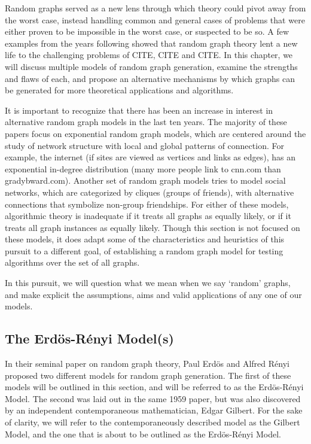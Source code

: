 \documentclass[11pt,a4paper]{report}
\begin{document}
Random graphs served as a new lens through which theory could pivot away from the worst case, instead handling common and general cases of problems that were either proven to be impossible in the worst case, or suspected to be so. 
A few examples from the years following showed that random graph theory lent a new life to the challenging problems of CITE, CITE and CITE.
In this chapter, we will discuss multiple models of random graph generation, examine the strengths and flaws of each, and propose an alternative mechanisms by which graphs can be generated for more theoretical applications and algorithms.

It is important to recognize that there has been an increase in interest in alternative random graph models in the last ten years.
The majority of these papers focus on exponential random graph models, which are centered around the study of network structure with local and global patterns of connection.
For example, the internet (if sites are viewed as vertices and links as edges), has an exponential in-degree distribution (many more people link to cnn.com than gradybward.com).
Another set of random graph models tries to model social networks, which are categorized by cliques (groups of friends), with alternative connections that symbolize non-group friendships.
For either of these models, algorithmic theory is inadequate if it treats all graphs as equally likely, or if it treats all graph instances as equally likely.
Though this section is not focused on these models, it does adapt some of the characteristics and heuristics of this pursuit to a different goal, of establishing a random graph model for testing algorithms over the set of all graphs.

In this pursuit, we will question what we mean when we say `random' graphs, and make explicit the assumptions, aims and valid applications of any one of our models. 

\subsection{The Erd\"os-R\'enyi Model(s)}

In their seminal paper on random graph theory, Paul Erd\"os and Alfred R\'enyi proposed two different models for random graph generation.
The first of these models will be outlined in this section, and will be referred to as the Erd\"os-R\'enyi Model.
The second was laid out in the same 1959 paper, but was also discovered by an independent contemporaneous mathematician, Edgar Gilbert.
For the sake of clarity, we will refer to the contemporaneously described model as the Gilbert Model, and the one that is about to be outlined as the Erd\"os-R\'enyi Model.
\end{document}
